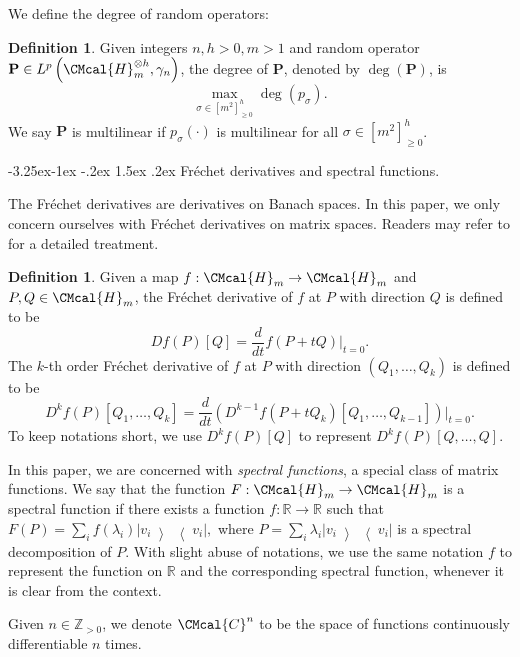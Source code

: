 \documentclass[10pt,a4paper]{article}
\makeatletter
\renewcommand{\subsubsection}{\@startsection{subsubsection}{2}{\z@}%
             {-3.25ex\@plus -1ex \@minus -.2ex}%
             {1.5ex \@plus .2ex}%
             {\normalfont\normalsize\scshape\bfseries}}
\def\C{\CMcal{C}}
\def\H{\CMcal{H}}
\theoremstyle{plain}
\theoremstyle{definition}
\newtheorem{definition}[theorem]{Definition}
\newcommand{\reals}{{\mathbb R}}
\newcommand {\br} [1] {\ensuremath{ \left( #1 \right) }}
\newcommand {\Br} [1] {\ensuremath{ \left[ #1 \right] }}
\newcommand {\ketbratwo} [2] {\ensuremath{ \left| #1 \middle\rangle \middle\langle #2 \right| }}
\newcommand {\ketbra} [1] {\ketbratwo{#1}{#1}}
\newcommand{\posint}{{\mathbb Z}_{>0}}
\newcommand{\1}{\mathbb{1}} %
\makeatother
\begin{document}
We define the degree of random operators:


	\begin{definition}\label{def:randop}
		Given integers $n,h>0, m>1$ and random operator $\mathbf{P}\in L^p\br{\H_m^{\otimes h},\gamma_n}$, the degree of $\mathbf{P}$, denoted by $\deg\br{\mathbf{P}}$, is \[\max_{\sigma\in[m^2]_{\geq 0}^h}\deg\br{p_{\sigma}}.\] We say $\mathbf{P}$ is multilinear if $p_{\sigma}\br{\cdot}$ is multilinear for all $\sigma\in[m^2]_{\geq 0}^h$.
	\end{definition}


\subsubsection{Fr\'echet derivatives and spectral functions.}

The Fr\'echet derivatives are derivatives on Banach spaces. In this paper, we only concern ourselves with Fr\'echet derivatives on matrix spaces. Readers may refer to \cite{Coleman} for a detailed treatment.


\begin{definition}\label{def:frechetderivative}
	Given a map $f:\H_m\rightarrow\H_m$ and $P, Q\in\H_m$, the Fr\'echet derivative of $f$ at $P$ with direction $Q$ is defined to be
	\[Df\br{P}\Br{Q}=\frac{d}{dt}f\br{P+tQ}|_{t=0}.\]
	The $k$-th order Fr\'echet derivative of $f$ at $P$ with direction $\br{Q_1,\ldots, Q_k}$ is defined to be
	\[D^kf\br{P}\Br{Q_1,\ldots, Q_k}=\frac{d}{dt}\br{D^{k-1}f\br{P+tQ_k}\Br{Q_1,\ldots, Q_{k-1}}}|_{t=0}.\]
To keep notations short, we use $D^kf\br{P}\Br{Q}$ to represent $D^kf\br{P}\Br{Q,\ldots,Q}$.
\end{definition}



In this paper, we are concerned with {\em spectral functions}, a special class of matrix functions. We say that the function $F:\H_m\rightarrow\H_m$ is a spectral function if there exists a function $f:\reals\rightarrow\reals$ such that $F\br{P}=\sum_if\br{\lambda_i}\ketbra{v_i},$ where $P=\sum_i\lambda_i\ketbra{v_i}$ is a spectral decomposition of $P$. With slight abuse of notations, we use the same notation $f$ to represent the function on $\reals$ and the corresponding spectral function, whenever it is clear from the context.

Given $n\in\posint$, we denote $\C^n$ to be the space of functions continuously differentiable $n$ times.
\end{document}
